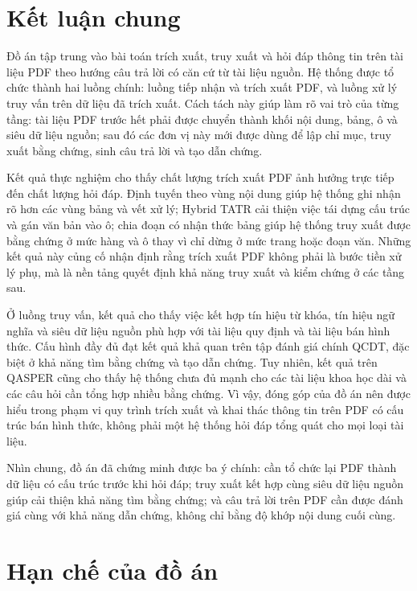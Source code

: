 \documentclass[../DoAn.tex]{subfiles}
\begin{document}
\section{Kết luận chung}
\label{section:general-conclusion}

Đồ án tập trung vào bài toán trích xuất, truy xuất và hỏi đáp thông tin trên tài
liệu PDF theo hướng câu trả lời có căn cứ từ tài liệu nguồn. Hệ thống được tổ
chức thành hai luồng chính: luồng tiếp nhận và trích xuất PDF, và luồng
xử lý truy vấn trên dữ liệu đã trích xuất. Cách tách này giúp làm rõ vai trò của
từng tầng: tài liệu PDF trước hết phải được chuyển thành khối nội dung, bảng, ô và
siêu dữ liệu nguồn; sau đó các đơn vị này mới được dùng để lập chỉ mục, truy xuất
bằng chứng, sinh câu trả lời và tạo dẫn chứng.

Kết quả thực nghiệm cho thấy chất lượng trích xuất PDF ảnh hưởng trực tiếp đến
chất lượng hỏi đáp. Định tuyến theo vùng nội dung giúp hệ thống ghi nhận rõ hơn
các vùng bảng và vết xử lý; Hybrid TATR cải thiện việc tái dựng cấu trúc và gán
văn bản vào ô; chia đoạn có nhận thức bảng giúp hệ thống truy xuất được bằng
chứng ở mức hàng và ô thay vì chỉ dừng ở mức trang hoặc đoạn văn. Những kết
quả này củng cố nhận định rằng trích xuất PDF không phải là bước tiền xử lý phụ,
mà là nền tảng quyết định khả năng truy xuất và kiểm chứng ở các tầng sau.

Ở luồng truy vấn, kết quả cho thấy việc kết hợp tín hiệu từ khóa, tín hiệu ngữ nghĩa
và siêu dữ liệu nguồn phù hợp với tài liệu quy định và tài liệu bán hình thức. Cấu hình
đầy đủ đạt kết quả khả quan trên tập đánh giá chính QCDT, đặc biệt ở
khả năng tìm bằng chứng và tạo dẫn chứng. Tuy nhiên, kết quả trên QASPER cũng
cho thấy hệ thống chưa đủ mạnh cho các tài liệu khoa học dài và các câu hỏi cần
tổng hợp nhiều bằng chứng. Vì vậy, đóng góp của đồ án nên được hiểu trong phạm
vi quy trình trích xuất và khai thác thông tin trên PDF có cấu trúc bán hình thức,
không phải một hệ thống hỏi đáp tổng quát cho mọi loại tài liệu.

Nhìn chung, đồ án đã chứng minh được ba ý chính: cần tổ chức lại PDF thành dữ
liệu có cấu trúc trước khi hỏi đáp; truy xuất kết hợp cùng siêu dữ liệu nguồn giúp cải
thiện khả năng tìm bằng chứng; và câu trả lời trên PDF cần được đánh giá cùng với
khả năng dẫn chứng, không chỉ bằng độ khớp nội dung cuối cùng.

\section{Hạn chế của đồ án}
\label{section:thesis-limitations}
\end{document}
